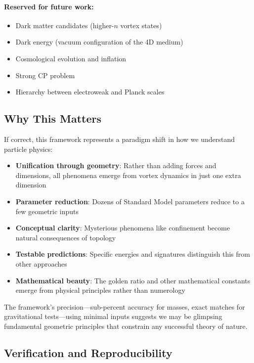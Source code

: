 \paragraph{Reserved for future work:}
\begin{itemize}
\item Dark matter candidates (higher-$n$ vortex states)
\item Dark energy (vacuum configuration of the 4D medium)
\item Cosmological evolution and inflation
\item Strong CP problem
\item Hierarchy between electroweak and Planck scales
\end{itemize}

\subsection{Why This Matters}

If correct, this framework represents a paradigm shift in how we understand particle physics:

\begin{itemize}
\item \textbf{Unification through geometry}: Rather than adding forces and dimensions, all phenomena emerge from vortex dynamics in just one extra dimension
\item \textbf{Parameter reduction}: Dozens of Standard Model parameters reduce to a few geometric inputs
\item \textbf{Conceptual clarity}: Mysterious phenomena like confinement become natural consequences of topology
\item \textbf{Testable predictions}: Specific energies and signatures distinguish this from other approaches
\item \textbf{Mathematical beauty}: The golden ratio and other mathematical constants emerge from physical principles rather than numerology
\end{itemize}

The framework's precision---sub-percent accuracy for masses, exact matches for gravitational tests---using minimal inputs suggests we may be glimpsing fundamental geometric principles that constrain any successful theory of nature.

\subsection{Verification and Reproducibility}
\label{subsec:verification}

